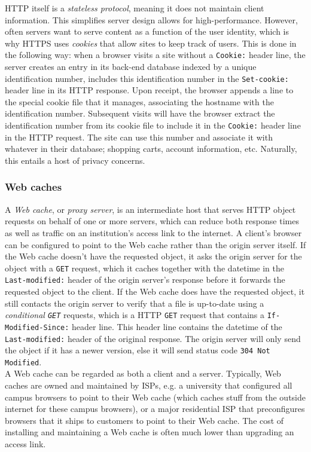 \documentclass[8pt, table, xcdraw]{article}%
\begin{document}
HTTP itself is a \emph{stateless protocol}, meaning it does not maintain client information. This simplifies server design allows for high-performance. However, often servers want to serve content as a function of the user identity, which is why HTTPS uses \emph{cookies} that allow sites to keep track of users. This is done in the following way: when a browser visits a site without a \lstinline{Cookie:} header line, the server creates an entry in its back-end database indexed by a unique identification number, includes this identification number in the \lstinline{Set-cookie:} header line in its HTTP response. Upon receipt, the browser appends a line to the special cookie file that it manages, associating the hostname with the  identification number. Subsequent visits will have the browser extract the identification number from its cookie file to include it in the \lstinline{Cookie:} header line in the HTTP request. The site can use this number and associate it with whatever in their database; shopping carts, account information, etc. Naturally, this entails a host of privacy concerns.

\subsubsection{Web caches}

A \emph{Web cache}, or \emph{proxy server}, is an intermediate host that serves HTTP object requests on behalf of one or more servers, which can reduce both response times as well as traffic on an institution's access link to the internet. A client's browser can be configured to point to the Web cache rather than the origin server itself. If the Web cache doesn't have the requested object, it asks the origin server for the object with a \texttt{GET} request, which it caches together with the datetime in the \texttt{Last-modified:} header of the origin server's response before it forwards the requested object to the client. If the Web cache does have the requested object, it still contacts the origin server to verify that a file is up-to-date using a \emph{conditional \texttt{GET}} requests, which is a HTTP \texttt{GET} request that contains a \texttt{If-Modified-Since:} header line. This header line contains the datetime of the \texttt{Last-modified:} header of the original response. The origin server will only send the object if it has a newer version, else it will send status code \texttt{304 Not Modified}.\\
A Web cache can be regarded as both a client and a server. Typically, Web caches are owned and maintained by ISPs, e.g. a university that configured all campus browsers to point to their Web cache (which caches stuff from the outside internet for these campus browsers), or a major residential ISP that preconfigures browsers that it ships to customers to point to their Web cache. The cost of installing and maintaining a Web cache is often much lower than upgrading an access link.
\end{document}
